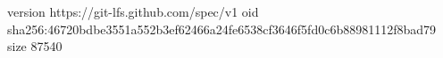 version https://git-lfs.github.com/spec/v1
oid sha256:46720bdbe3551a552b3ef62466a24fe6538cf3646f5fd0c6b88981112f8bad79
size 87540
